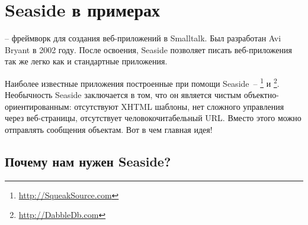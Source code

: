 \documentclass[a4paper,10pt,twoside]{book}
\begin{document}
	\sloppy
\fi

\chapter{Seaside в примерах}




 -- фреймворк для создания веб-приложений в Smalltalk.
Был разработан Avi Bryant  в 2002 году.
После освоения, Seaside позволяет писать веб-приложения так же легко как и стандартные
приложения.


Наиболее известные приложения построенные при помощи \hbox{Seaside --}
\footnote{\url{http://SqueakSource.com}}
и \footnote{\url{http://DabbleDb.com}}.
Необычность Seaside заключается в том, что он является чистым объектно-ориентированным:
отсутствуют XHTML шаблоны, нет сложного управления через веб-страницы, отсутствует
человокочитабельный URL.
Вместо этого можно отправлять сообщения объектам.
Вот в чем главная идея!

\section{Почему нам нужен Seaside?}
\end{document}

